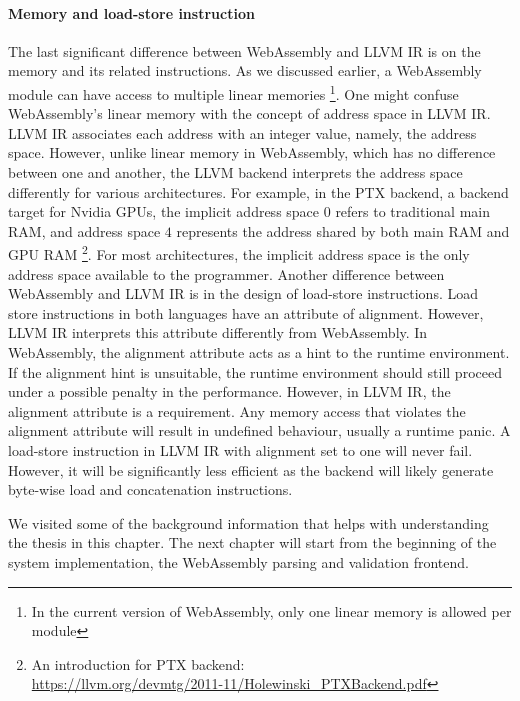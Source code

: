 \paragraph{Memory and load-store instruction}
The last significant difference between WebAssembly and LLVM IR is on the memory
and its related instructions. As we discussed earlier, a WebAssembly module can
have access to multiple linear memories \footnote{In the current version of
  WebAssembly, only one linear memory is allowed per module}. One might confuse
WebAssembly's linear memory with the concept of address space in LLVM IR. LLVM
IR associates each address with an integer value, namely, the address space.
However, unlike linear memory in WebAssembly, which has no difference between
one and another, the LLVM backend interprets the address space differently for
various architectures. For example, in the PTX backend, a backend target for
Nvidia GPUs, the implicit address space $0$ refers to traditional main RAM, and
address space $4$ represents the address shared by both main RAM and GPU RAM
\footnote{An introduction for PTX backend:
  \\\url{https://llvm.org/devmtg/2011-11/Holewinski_PTXBackend.pdf}}. For most
architectures, the implicit address space is the only address space
available to the programmer. Another difference between WebAssembly and LLVM IR
is in the design of load-store instructions. Load store instructions in both
languages have an attribute of alignment. However, LLVM IR interprets this
attribute differently from WebAssembly. In WebAssembly, the alignment attribute
acts as a hint to the runtime environment. If the alignment hint is unsuitable,
the runtime environment should still proceed under a possible penalty in the
performance. However, in LLVM IR, the alignment attribute is a requirement.
Any memory access that violates the alignment attribute will result in
undefined behaviour, usually a runtime panic. A load-store instruction in LLVM
IR with alignment set to one will never fail. However, it will be significantly
less efficient as the backend will likely generate byte-wise load and
concatenation instructions.

We visited some of the background information that helps with understanding the
thesis in this chapter. The next chapter will start from the beginning of
the system implementation, the WebAssembly parsing and validation frontend.